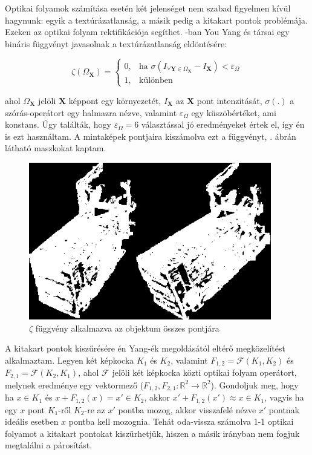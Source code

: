 Optikai folyamok számítása esetén két jelenséget nem szabad figyelmen kívül hagynunk: egyik a textúrázatlanság, a másik pedig a kitakart pontok problémája. Ezeken az optikai folyam rektifikációja segíthet. \cite{optical-flow-rectification}-ban You Yang és társai egy bináris függvényt javasolnak a textúrázatlanság eldöntésére:

\[
    \zeta(\Omega_\mathbf{X})= 
\begin{cases}
    0,              & \text{ha } \sigma(I_{\forall \mathbf{Y}\in\Omega_\mathbf{X}} - I_\mathbf{X}) < \varepsilon_\Omega\\
    1,              & \text{különben}
\end{cases}
\]

ahol $\Omega_\mathbf{X}$ jelöli $\mathbf{X}$ képpont egy környezetét, $I_\mathbf{X}$ az $\mathbf{X}$ pont intenzitását, $\sigma(.)$ a szórás-operátort egy halmazra nézve, valamint $\varepsilon_\Omega$ egy küszöbértéket, ami konstans. Úgy találták, hogy $\varepsilon_\Omega = 6$ választással jó eredményeket értek el, így én is ezt használtam. A mintaképek pontjaira kiszámolva ezt a függvényt, . ábrán látható maszkokat kaptam.

\begin{figure}[tbh]
\centering
\includegraphics[width=300pt]{figures/textures.png}
\caption{$\zeta$ függvény alkalmazva az objektum összes pontjára \label{fig:textures}}
\end{figure}

A kitakart pontok kiszűrésére én Yang-ék megoldásától \cite{optical-flow-rectification} eltérő megközelítést alkalmaztam. Legyen két képkocka $K_1$ és $K_2$, valamint $F_{1, 2} = \mathcal{F}(K_1, K_2)$ és $F_{2, 1} = \mathcal{F}(K_2, K_1)$, ahol $\mathcal{F}$ jelöli két képkocka közti optikai folyam operátort, melynek eredménye egy vektormező ($F_{1, 2}, F_{2, 1} : \mathbb{R}^2 \rightarrow \mathbb{R}^2$). Gondoljuk meg, hogy ha $x\in K_1$ és $x + F_{1,2}(x) = x' \in K_2$, akkor $x' + F_{1,2}(x') \approx x \in K_1$, vagyis ha egy $x$ pont $K_1$-ről $K_2$-re az $x'$ pontba mozog, akkor visszafelé nézve $x'$ pontnak ideális esetben $x$ pontba kell mozognia. Tehát oda-vissza számolva 1-1 optikai folyamot a kitakart pontokat kiszűrhetjük, hiszen a másik irányban nem fogjuk megtalálni a párosítást.

